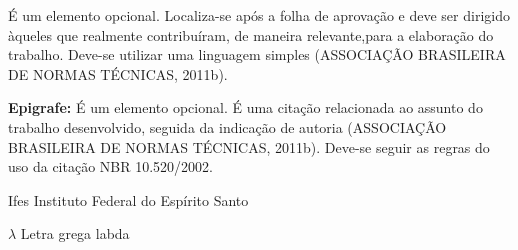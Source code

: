     \begin{agradecimentos}
    É um elemento opcional. Localiza-se após a folha de aprovação e deve ser dirigido àqueles que realmente contribuíram, de maneira relevante,para a elaboração do trabalho. Deve-se utilizar uma linguagem simples (ASSOCIAÇÃO BRASILEIRA DE NORMAS TÉCNICAS, 2011b).
    \end{agradecimentos}

    \begin{epigrafe}
    \vspace*{\fill}
    \begin{center}
        \textbf{Epigrafe:} É um elemento opcional. É uma citação relacionada ao assunto do trabalho desenvolvido, seguida da indicação de autoria (ASSOCIAÇÃO BRASILEIRA DE NORMAS TÉCNICAS, 2011b).   Deve-se seguir as regras do uso da citação NBR 10.520/2002. 
    \end{center}
    \end{epigrafe}

    \listoffigures*
    \cleardoublepage

    \listoftables*
    \cleardoublepage

    \listofquadros*
    \cleardoublepage

    \begin{siglas}
        \item[Ifes] Instituto Federal do Espírito Santo
    \end{siglas}

    \begin{simbolos}
        \item[$\lambda$] Letra grega labda
    \end{simbolos}


    \begin{apendicesenv}
        
    \end{apendicesenv}

    \begin{anexosenv}
        
    \end{anexosenv}

    \printindex